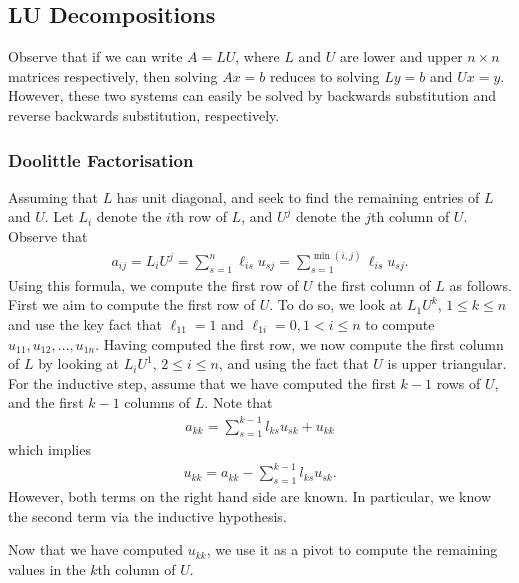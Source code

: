 \documentclass[12pt,reqno]{amsart}
\numberwithin{equation}{section}  %
\begin{document}
\subsection{LU Decompositions} 
Observe that if we can write $A = LU$, where
$L$ and $U$ are lower and upper $n \times n$ matrices respectively,
then solving $Ax = b$ reduces to solving $Ly = b$ and $Ux = y$.
However, these two systems can easily be solved by backwards substitution
and reverse backwards substitution, respectively.

\subsubsection{Doolittle Factorisation}
Assuming that $L$ has unit diagonal, and seek to find the remaining
entries of $L$ and $U$. Let $L_i$ denote the $i$th row of $L$,
and $U^j$ denote the $j$th column of $U$. Observe that
\begin{align*}
a_{ij} = L_i U^j = \sum_{s=1}^n \ell_{is} u_{sj} = \sum_{s=1}^{\min(i,j)} \ell_{is} u_{sj}.
\end{align*}
Using this formula, we compute the first row of $U$ 
the first column of $L$ as follows. First we aim to compute the first row of $U$.
To do so, we look at $L_1 U^k$, $1 \le k \le n$ and
use the key fact that $\ell_{11} = 1$ and $\ell_{1i} = 0, 1 < i \le n$
to compute $u_{11}, u_{12}, \ldots, u_{1n}$. 
Having computed the first row, we now compute the first column of $L$
by looking at $L_i U^1$, $2 \le i \le n$, and using the fact that
$U$ is upper triangular. 
For the inductive step, assume that we have computed the first $k-1$ rows
of $U$, and the first $k-1$ columns of $L$. Note that
\begin{align*}
a_{kk} = \sum_{s=1}^{k-1}l_{ks}u_{sk} + u_{kk}
\end{align*}
which implies
\begin{align*}
u_{kk} = a_{kk} - \sum_{s=1}^{k-1}l_{ks}u_{sk}.
\end{align*}
However, both terms on the right hand side are known. In particular,
we know the second term via the inductive hypothesis. 

Now that we have computed $u_{kk}$, we use it as a pivot to compute
the remaining values in the $k$th column of $U$. 
\end{document}
